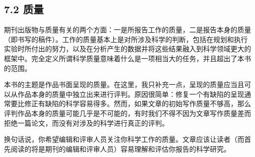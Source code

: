\subsection*{7.2 质量}
期刊出版物与质量有关的两个方面：一是所报告工作的质量，二是报告本身的质量（即书写的稿件）。工作的质量基本上是对所涉及科学的判断，包括在规划和执行实验时所付出的努力，以及在分析产生的数据并将这些结果融入到科学领域更大的框架中。完全定义所谓科学质量意味着什么是一项相当大的任务，并且超出了本书的范围。

本书的主题是作品书面呈现的质量。在这里，我只补充一点，呈现的质量应当且可以从作品本身的质量中独立出来进行评判。原因很简单：修复一个有缺陷的呈现通常要比修正有缺陷的科学容易得多。然而，如果文章的初始写作质量不够高，那么评判作品本身的质量可能几乎是不可能的，有时我们不得不因为文章写作质量差而拒绝一篇论文，而没有对涉及的科学进行真正的评判。

换句话说，你希望编辑和评审人员关注你科学工作的质量。文章应该让读者（而首先阅读的将是期刊的编辑和评审人员）容易理解和评估你报告的科学研究。

